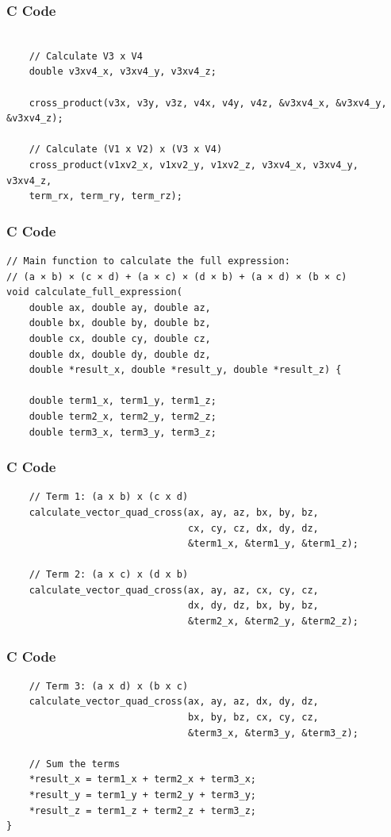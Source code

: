 \documentclass{beamer}
\begin{document}
\begin{frame}[fragile]
\frametitle{C Code}
\begin{lstlisting}

    // Calculate V3 x V4
    double v3xv4_x, v3xv4_y, v3xv4_z;
    
    cross_product(v3x, v3y, v3z, v4x, v4y, v4z, &v3xv4_x, &v3xv4_y, &v3xv4_z);

    // Calculate (V1 x V2) x (V3 x V4)
    cross_product(v1xv2_x, v1xv2_y, v1xv2_z, v3xv4_x, v3xv4_y, v3xv4_z,
    term_rx, term_ry, term_rz);
\end{lstlisting}
\end{frame}

\begin{frame}[fragile]
\frametitle{C Code}
\begin{lstlisting}
// Main function to calculate the full expression:
// (a × b) × (c × d) + (a × c) × (d × b) + (a × d) × (b × c)
void calculate_full_expression(
    double ax, double ay, double az,
    double bx, double by, double bz,
    double cx, double cy, double cz,
    double dx, double dy, double dz,
    double *result_x, double *result_y, double *result_z) {

    double term1_x, term1_y, term1_z;
    double term2_x, term2_y, term2_z;
    double term3_x, term3_y, term3_z;

\end{lstlisting}
\end{frame}

\begin{frame}[fragile]
\frametitle{C Code}
\begin{lstlisting}
    // Term 1: (a x b) x (c x d)
    calculate_vector_quad_cross(ax, ay, az, bx, by, bz,
                                cx, cy, cz, dx, dy, dz,
                                &term1_x, &term1_y, &term1_z);

    // Term 2: (a x c) x (d x b)
    calculate_vector_quad_cross(ax, ay, az, cx, cy, cz,
                                dx, dy, dz, bx, by, bz,
                                &term2_x, &term2_y, &term2_z);
\end{lstlisting}
\end{frame}

\begin{frame}[fragile]
\frametitle{C Code}
\begin{lstlisting}
    // Term 3: (a x d) x (b x c)
    calculate_vector_quad_cross(ax, ay, az, dx, dy, dz,
                                bx, by, bz, cx, cy, cz,
                                &term3_x, &term3_y, &term3_z);

    // Sum the terms
    *result_x = term1_x + term2_x + term3_x;
    *result_y = term1_y + term2_y + term3_y;
    *result_z = term1_z + term2_z + term3_z;
}
\end{lstlisting}
\end{frame}
\end{document}
